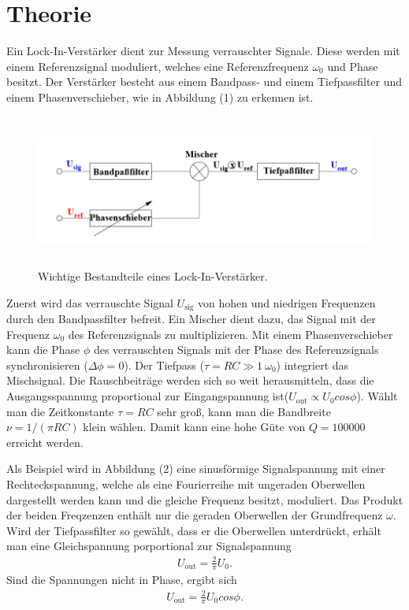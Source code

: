 \section{Theorie}
\label{sec:Theorie}

Ein Lock-In-Verstärker dient zur Messung verrauschter Signale. 
Diese werden mit einem Referenzsignal moduliert, welches eine Referenzfrequenz $\omega_0$ und Phase besitzt.
Der Verstärker besteht aus einem Bandpass- und einem Tiefpassfilter und einem Phasenverschieber, wie in Abbildung (1) zu erkennen ist.

\begin{figure}[H]
  \centering
  \includegraphics[height=5cm]{theorie.png}
  \caption{Wichtige Bestandteile eines Lock-In-Verstärker. \cite[S. 1]{l}}
\end{figure}

\noindent Zuerst wird das verrauschte Signal $U_\text{sig}$ von hohen und niedrigen Frequenzen durch den Bandpassfilter befreit.
Ein Mischer dient dazu, das Signal mit der Frequenz $\omega_0$ des Referenzsignals zu multiplizieren.
Mit einem Phasenverschieber kann die Phase $\phi$ des verrauschten Signals mit der Phase des Referenzsignals synchronisieren ($\Delta \phi = 0$).
Der Tiefpass ($\tau = RC \gg 1\ \omega_0 $) integriert das Mischsignal.
Die Rauschbeiträge werden sich so weit herausmitteln, dass die Ausgangsspannung proportional zur Eingangspannung ist($U_\text{out} \propto U_0 cos\phi $).
Wählt man die Zeitkonstante $\tau = RC$ sehr groß, kann man die Bandbreite $\nu = 1/(\pi RC)$ klein wählen.
Damit kann eine hohe Güte von $Q = 100000$ erreicht werden.

\noindent Als Beispiel wird in Abbildung (2) eine sinusförmige Signalspannung mit einer Rechteckspannung, welche als eine Fourierreihe mit ungeraden Oberwellen dargestellt werden kann und die gleiche Frequenz besitzt, moduliert.
Das Produkt der beiden Freqzenzen enthält nur die geraden Oberwellen der Grundfrequenz $\omega$. 
Wird der Tiefpassfilter so gewählt, dass er die Oberwellen unterdrückt, erhält man eine Gleichspannung porportional zur Signalspannung
\begin{align}
U_\text{out} = \frac{2}{\pi} U_0 .
\end{align}
Sind die Spannungen nicht in Phase, ergibt sich
\begin{align}
U_\text{out} = \frac{2}{\pi} U_0 cos \phi .
\end{align}

